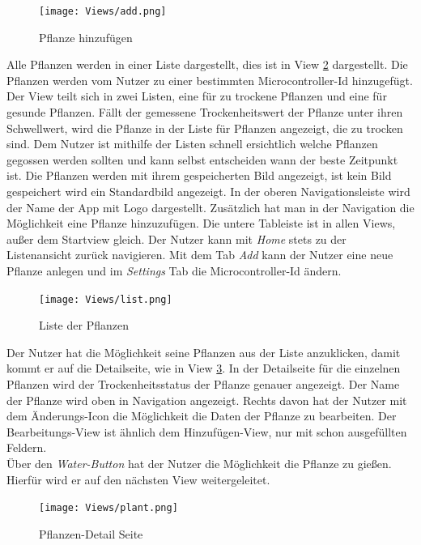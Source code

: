 \begin{figure}[H]
    \centering
    \texttt{[image: Views/add.png]}
    \caption{Pflanze hinzufügen}
    \label{add}
\end{figure}

Alle Pflanzen werden in einer Liste dargestellt, dies ist in View \ref{list} dargestellt. Die Pflanzen werden vom Nutzer zu einer bestimmten Microcontroller-Id hinzugefügt. Der View teilt sich in zwei Listen, eine für zu trockene Pflanzen und eine für gesunde Pflanzen. Fällt der gemessene Trockenheitswert der Pflanze unter ihren Schwellwert, wird die Pflanze in der Liste für Pflanzen angezeigt, die zu trocken sind. Dem Nutzer ist mithilfe der Listen schnell ersichtlich welche Pflanzen gegossen werden sollten und kann selbst entscheiden wann der beste Zeitpunkt ist. Die Pflanzen werden mit ihrem gespeicherten Bild angezeigt, ist kein Bild gespeichert wird ein Standardbild angezeigt. In der oberen Navigationsleiste wird der Name der App mit Logo dargestellt. Zusätzlich hat man in der Navigation die Möglichkeit eine Pflanze hinzuzufügen. Die untere Tableiste ist in allen Views, außer dem Startview gleich. Der Nutzer kann mit \textit{Home} stets zu der Listenansicht zurück navigieren. Mit dem Tab \textit{Add} kann der Nutzer eine neue Pflanze anlegen und im \textit{Settings} Tab die Microcontroller-Id ändern.
\begin{figure}[H]
    \centering
    \texttt{[image: Views/list.png]}
    \caption{Liste der Pflanzen}
    \label{list}
\end{figure}

Der Nutzer hat die Möglichkeit seine Pflanzen aus der Liste anzuklicken, damit kommt er auf die Detailseite, wie in View \ref{plant}. In der Detailseite für die einzelnen Pflanzen wird der Trockenheitsstatus der Pflanze genauer angezeigt. Der Name der Pflanze wird oben in Navigation angezeigt. Rechts davon hat der Nutzer mit dem Änderungs-Icon die Möglichkeit die Daten der Pflanze zu bearbeiten. Der Bearbeitungs-View ist ähnlich dem Hinzufügen-View, nur mit schon ausgefüllten Feldern. \\

Über den \textit{Water-Button} hat der Nutzer die Möglichkeit die Pflanze zu gießen. Hierfür wird er auf den nächsten View weitergeleitet. 

\begin{figure}[H]
    \centering
    \texttt{[image: Views/plant.png]}
    \caption{Pflanzen-Detail Seite}
    \label{plant}
\end{figure}

